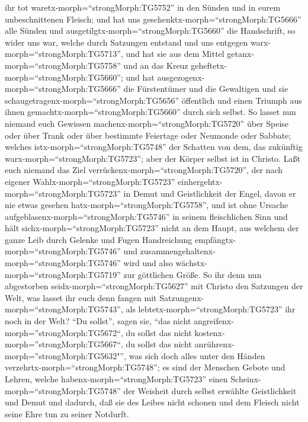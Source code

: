 ihr tot waretx-morph=``strongMorph:TG5752'' in den Sünden und in eurem
unbeschnittenen Fleisch; und hat uns
geschenktx-morph=``strongMorph:TG5666'' alle Sünden  und
ausgetilgtx-morph=``strongMorph:TG5660'' die Handschrift, so wider uns
war, welche durch Satzungen entstand und uns entgegen
warx-morph=``strongMorph:TG5713'', und hat sie aus dem Mittel
getanx-morph=``strongMorph:TG5758'' und an das Kreuz
geheftetx-morph=``strongMorph:TG5660'';  und hat
ausgezogenx-morph=``strongMorph:TG5666'' die Fürstentümer und die
Gewaltigen und sie schaugetragenx-morph=``strongMorph:TG5656''
öffentlich und einen Triumph aus ihnen
gemachtx-morph=``strongMorph:TG5660'' durch sich selbst. 
So lasset nun niemand euch Gewissen machenx-morph=``strongMorph:TG5720''
über Speise oder über Trank oder über bestimmte Feiertage oder Neumonde
oder Sabbate;  welches istx-morph=``strongMorph:TG5748''
der Schatten von dem, das zukünftig warx-morph=``strongMorph:TG5723'';
aber der Körper selbst ist in Christo.  Laßt euch niemand
das Ziel verrückenx-morph=``strongMorph:TG5720'', der nach eigener
Wahlx-morph=``strongMorph:TG5723''
einhergehtx-morph=``strongMorph:TG5723'' in Demut und Geistlichkeit der
Engel, davon er nie etwas gesehen hatx-morph=``strongMorph:TG5758'', und
ist ohne Ursache aufgeblasenx-morph=``strongMorph:TG5746'' in seinem
fleischlichen Sinn  und hält
sichx-morph=``strongMorph:TG5723'' nicht an dem Haupt, aus welchem der
ganze Leib durch Gelenke und Fugen Handreichung
empfängtx-morph=``strongMorph:TG5746'' und
zusammengehaltenx-morph=``strongMorph:TG5746'' wird und also
wächstx-morph=``strongMorph:TG5719'' zur göttlichen Größe. 
So ihr denn nun abgestorben seidx-morph=``strongMorph:TG5627'' mit
Christo den Satzungen der Welt, was lasset ihr euch denn fangen mit
Satzungenx-morph=``strongMorph:TG5743'', als
lebtetx-morph=``strongMorph:TG5723'' ihr noch in der Welt? 
``Du sollst'', sagen sie, ``das nicht
angreifenx-morph=''strongMorph:TG5672``, du sollst das nicht
kostenx-morph=''strongMorph:TG5667``, du sollst das nicht
anrührenx-morph=''strongMorph:TG5632"'',  was sich doch
alles unter den Händen verzehrtx-morph=``strongMorph:TG5748''; es sind
der Menschen Gebote und Lehren,  welche
habenx-morph=``strongMorph:TG5723'' einen
Scheinx-morph=``strongMorph:TG5748'' der Weisheit durch selbst erwählte
Geistlichkeit und Demut und dadurch, daß sie des Leibes nicht schonen
und dem Fleisch nicht seine Ehre tun zu seiner Notdurft.

